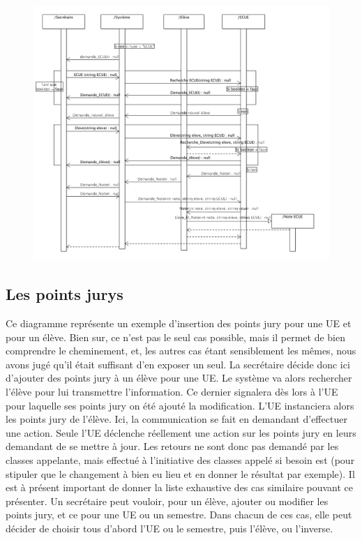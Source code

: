\documentclass[letter, 11pt] {article}
\begin{document}
		\begin{figure}[htbp]
				\includegraphics[scale = 0.53]{../Diagrammes_sequence/Diagramme_sequence_insertion_ECUE.png}
		\end{figure}
		
		\newpage
		
		\subsection{Les points jurys}
		
		Ce diagramme représente un exemple d’insertion des points jury pour une UE et pour un élève. Bien sur, ce n’est pas le seul cas possible, mais il permet de bien comprendre le cheminement, et, les autres cas étant sensiblement les mêmes, nous avons jugé qu’il était suffisant d’en exposer un seul.
		La secrétaire décide donc ici d’ajouter des points jury à un élève pour une UE. Le système va alors rechercher l’élève pour lui transmettre l’information. Ce dernier signalera dès lors à l’UE pour laquelle ses points jury on été ajouté la modification. L’UE instanciera alors les points jury de l’élève. Ici, la communication se fait en demandant d’effectuer une action. Seule l’UE déclenche réellement une action sur les points jury en leurs demandant de se mettre à jour. Les retours ne sont donc pas demandé par les classes appelante, mais effectué à l’initiative des classes appelé si besoin est (pour stipuler que le changement à bien eu lieu et en donner le résultat par exemple).
		Il est à présent important de donner la liste exhaustive des cas similaire pouvant ce présenter. Un secrétaire peut vouloir, pour un élève, ajouter ou modifier les points jury, et ce pour une UE ou un semestre. Dans chacun de ces cas, elle peut décider de choisir tous d’abord l’UE ou le semestre, puis l’élève, ou l’inverse.
	
\end{document}
